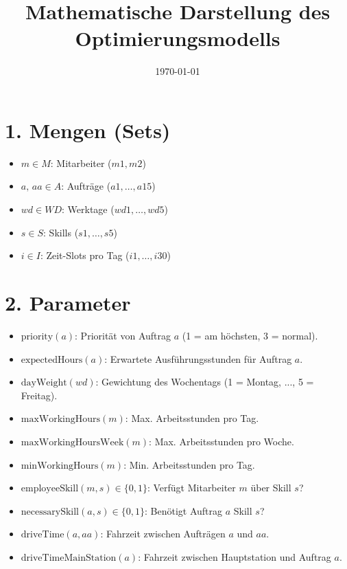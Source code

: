 \documentclass[12pt,a4paper]{article}
\title{Mathematische Darstellung des Optimierungsmodells}
\date{\today}
\begin{document}
\maketitle

\section*{1. Mengen (Sets)}
\begin{itemize}
  \item $m \in M$: Mitarbeiter ($m1, m2$)
  \item $a,\,aa \in A$: Aufträge ($a1, \dots, a15$)
  \item $wd \in WD$: Werktage ($wd1, \dots, wd5$)
  \item $s \in S$: Skills ($s1, \dots, s5$)
  \item $i \in I$: Zeit-Slots pro Tag ($i1, \dots, i30$)
\end{itemize}

\section*{2. Parameter}
\begin{itemize}
  \item $\text{priority}(a)$: Priorität von Auftrag $a$ (1 = am höchsten, 3 = normal).
  \item $\text{expectedHours}(a)$: Erwartete Ausführungsstunden für Auftrag $a$.
  \item $\text{dayWeight}(wd)$: Gewichtung des Wochentags (1 = Montag, ..., 5 = Freitag).
  \item $\text{maxWorkingHours}(m)$: Max. Arbeitsstunden pro Tag.
  \item $\text{maxWorkingHoursWeek}(m)$: Max. Arbeitsstunden pro Woche.
  \item $\text{minWorkingHours}(m)$: Min. Arbeitsstunden pro Tag.
  \item $\text{employeeSkill}(m,s) \in \{0,1\}$: Verfügt Mitarbeiter $m$ über Skill $s$?
  \item $\text{necessarySkill}(a,s) \in \{0,1\}$: Benötigt Auftrag $a$ Skill $s$?
  \item $\text{driveTime}(a,aa)$: Fahrzeit zwischen Aufträgen $a$ und $aa$.
  \item $\text{driveTimeMainStation}(a)$: Fahrzeit zwischen Hauptstation und Auftrag $a$.
\end{itemize}
\end{document}
